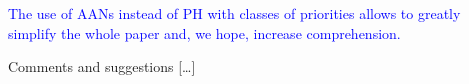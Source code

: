 \documentclass[11pt]{article}
\newcommand{\answer}[1]{\textcolor{blue}{#1}\vspace*{1em}}
\begin{document}
\answer{
The use of AANs instead of PH with classes of priorities
allows to greatly simplify the whole paper
and, we hope, increase comprehension.
}

Comments and suggestions […]

% 
% 
% 
% 
% 
% 
% 
% 
% 
% 
% 
% 
% 
% 
% 
% 
% 
% 
% 
\end{document}
